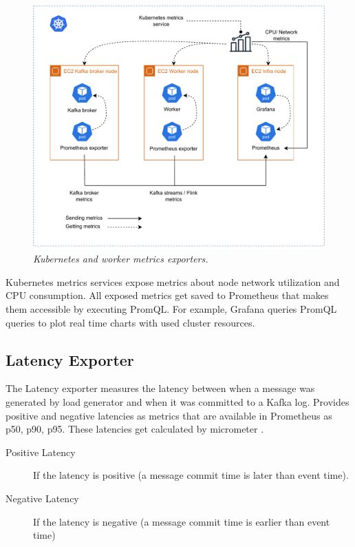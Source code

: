 \begin{figure}[ht]
    \centering
    \includegraphics[width=1\textwidth]{figures/metrics-collection}
    \caption{\textit{Kubernetes and worker metrics exporters.}}
    \label{fig:metrics-collection}
\end{figure}

Kubernetes metrics services expose metrics about node network utilization and CPU consumption.
All exposed metrics get saved to Prometheus that makes them accessible by executing PromQL.
For example, Grafana queries PromQL queries to plot real time charts with used cluster resources.

\subsection{Latency Exporter}\label{subsec:latency-exporter}
The Latency exporter measures the latency between when a message was generated by load generator and when
it was committed to a Kafka log.
Provides positive and negative latencies as metrics that are available in Prometheus as p50, p90, p95.
These latencies get calculated by micrometer \cite{micrometer}.

\begin{description}
    \item[Positive Latency] If the latency is positive (a message commit time is later than event time).
    \item[Negative Latency] If the latency is negative (a message commit time is earlier than event time)
\end{description}


